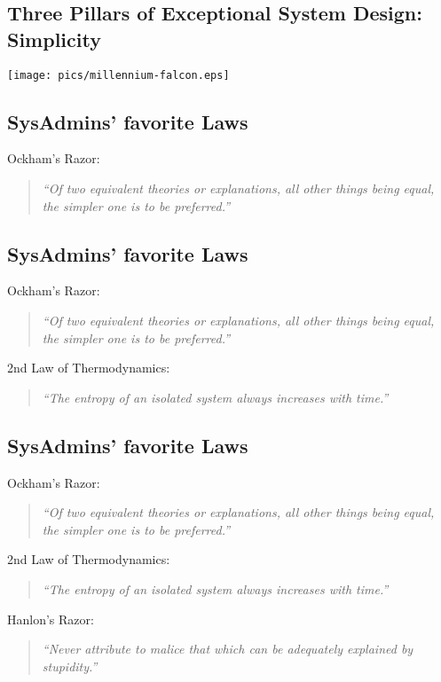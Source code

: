 \documentclass[xga]{xdvislides}
\newcommand{\smallish}{\fontsize{18}{18}\selectfont}
\begin{document}
\subsection{Three Pillars of Exceptional System Design: Simplicity}
\vspace*{\fill}
\begin{center}
    \texttt{[image: pics/millennium-falcon.eps]} \\
\end{center}
\vspace*{\fill}

\subsection{SysAdmins' favorite Laws}
\smallish
Ockham's Razor:
\begin{quote}
{\em ``Of two equivalent theories or explanations, all other things being
equal, the simpler one is to be preferred.''}
\end{quote}
\Normalsize

\subsection{SysAdmins' favorite Laws}
\smallish
Ockham's Razor:
\begin{quote}
{\em ``Of two equivalent theories or explanations, all other things being
equal, the simpler one is to be preferred.''}
\end{quote}

2nd Law of Thermodynamics:
\begin{quote}
{\em ``The entropy of an isolated system always increases with time.''}
\end{quote}
\Normalsize

\subsection{SysAdmins' favorite Laws}
\smallish
Ockham's Razor:
\begin{quote}
{\em ``Of two equivalent theories or explanations, all other things being
equal, the simpler one is to be preferred.''}
\end{quote}

2nd Law of Thermodynamics:
\begin{quote}
{\em ``The entropy of an isolated system always increases with time.''}
\end{quote}

Hanlon's Razor:
\begin{quote}
{\em ``Never attribute to malice that which can be adequately explained by
stupidity.''}
\end{quote}
\Normalsize
\end{document}
